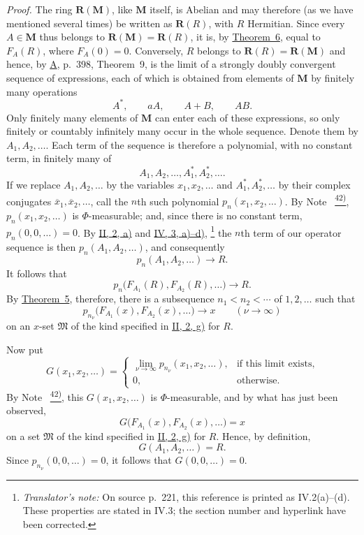 \documentclass[12pt,b5paper,twoside]{article}
\newcommand{\noteref}[1]{%
  \hyperlink{note:#1}{\textsuperscript{#1)}}}
\newcommand{\translatorfootnote}[2]{%
  \begingroup
  \renewcommand{\thefootnote}{#1}%
  \footnote{\hspace{0.8em}\textit{Translator's note:} #2}%
  \endgroup}
\begin{document}
\smallskip
\noindent\textit{Proof.}
The ring $\mathbf R(\mathbf M)$, like $\mathbf M$ itself, is Abelian and may
therefore (as we have mentioned several times) be written as $\mathbf R(R)$, with
$R$ Hermitian.  Since every $A\in \mathbf M$ thus belongs to
$\mathbf R(\mathbf M)=\mathbf R(R)$, it is, by
\hyperref[thm:6]{Theorem~6}, equal to $F_A(R)$, where $F_A(0)=0$.  Conversely,
$R$ belongs to $\mathbf R(R)=\mathbf R(\mathbf M)$ and hence, by \hyperref[ref:A]{A}, p.~398,
Theorem~9, is the limit of a strongly doubly convergent sequence of expressions, each
of which is obtained from elements of $\mathbf M$ by finitely many operations
\[
 A^*,\qquad aA,\qquad A+B,\qquad AB.
\]
Only finitely many elements of $\mathbf M$ can enter each of these expressions, so
only finitely or countably infinitely many occur in the whole sequence.  Denote them
by $A_1,A_2,\ldots$.  Each term of the sequence is therefore a polynomial, with no
constant term, in finitely many of
\[
 A_1,A_2,\ldots,A_1^*,A_2^*,\ldots.
\]
If we replace $A_1,A_2,\ldots$ by the variables $x_1,x_2,\ldots$ and
$A_1^*,A_2^*,\ldots$ by their complex conjugates
$\overline{x}_1,\overline{x}_2,\ldots$, call the $n$th such polynomial
$p_n(x_1,x_2,\ldots)$.  By Note~\noteref{42}, $p_n(x_1,x_2,\ldots)$ is
$\Phi$-measurable; and, since there is no constant term,
$p_n(0,0,\ldots)=0$.  By \hyperref[sec:II.2]{II, 2, a)} and
\hyperref[sec:IV.3]{IV, 3, a)--d)},\translatorfootnote{T14}{On source p.~221, this reference is printed as IV.2(a)--(d). These properties are stated in IV.3; the section number and hyperlink have been corrected.} the $n$th term of our operator sequence is then
$p_n(A_1,A_2,\ldots)$, and consequently
\[
 p_n(A_1,A_2,\ldots)\longrightarrow R.
\]
It follows that
\[
 p_n\bigl(F_{A_1}(R),F_{A_2}(R),\ldots\bigr)\longrightarrow R.
\]
By \hyperref[thm:5]{Theorem~5}, therefore, there is a subsequence
$n_1<n_2<\cdots$ of $1,2,\ldots$ such that
\[
 p_{n_\nu}\bigl(F_{A_1}(x),F_{A_2}(x),\ldots\bigr)\longrightarrow x
 \qquad(\nu\to\infty)
\]
on an $x$-set $\mathfrak M$ of the kind specified in
\hyperref[sec:II.2]{II, 2, g)} for $R$.

Now put
\[
 G(x_1,x_2,\ldots)=
 \begin{cases}
   \displaystyle\lim_{\nu\to\infty}p_{n_\nu}(x_1,x_2,\ldots),
     & \text{if this limit exists},\\[2pt]
   0, & \text{otherwise}.
 \end{cases}
\]
By Note~\noteref{42}, this $G(x_1,x_2,\ldots)$ is $\Phi$-measurable, and by what has
just been observed,
\[
 G\bigl(F_{A_1}(x),F_{A_2}(x),\ldots\bigr)=x
\]
on a set $\mathfrak M$ of the kind specified in
\hyperref[sec:II.2]{II, 2, g)} for $R$.  Hence, by definition,
\[
 G(A_1,A_2,\ldots)=R.
\]
Since $p_{n_\nu}(0,0,\ldots)=0$, it follows that $G(0,0,\ldots)=0$.
\end{document}
